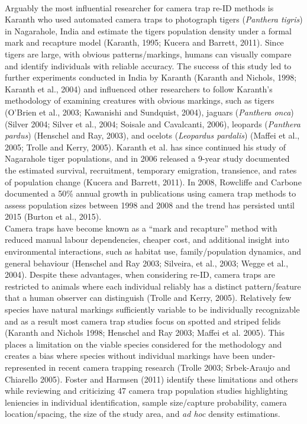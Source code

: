 \documentclass[11pt]{article}
\begin{document}
\newline
\\
Arguably the most influential researcher for camera trap re-ID methods is Karanth who used automated camera traps to photograph tigers (\textit{Panthera tigris}) in Nagarahole, India and estimate the tigers population density under a formal mark and recapture model (Karanth, 1995; Kucera and Barrett, 2011). Since tigers are large, with obvious patterns/markings, humans can visually compare and identify individuals with reliable accuracy. The success of this study led to further experiments conducted in India by Karanth (Karanth and Nichols, 1998; Karanth et al., 2004) and influenced other researchers to follow Karanth's methodology of examining creatures with obvious markings, such as tigers (O'Brien et al., 2003; Kawanishi and Sundquist, 2004), jaguars (\textit{Panthera onca}) (Silver 2004; Silver et al., 2004; Soisale and Cavalcanti, 2006), leopards (\textit{Panthera pardus}) (Henschel and Ray, 2003), and ocelots (\textit{Leopardus pardalis}) (Maffei et al., 2005; Trolle and Kerry, 2005). Karanth et al. has since continued his study of Nagarahole tiger populations, and in 2006 released a 9-year study documented the estimated survival, recruitment, temporary emigration, transience, and rates of population change (Kucera and Barrett, 2011). In 2008, Rowcliffe and Carbone documented a 50\% annual growth in publications using camera trap methods to assess population sizes between 1998 and 2008 and the trend has persisted until 2015 (Burton et al., 2015).
\newline
\\
Camera traps have become known as a ``mark and recapture'' method with reduced manual labour dependencies, cheaper cost, and additional insight into environmental interactions, such as habitat use, family/population dynamics, and general behaviour (Henschel and Ray 2003; Silveira, et al., 2003; Wegge et al., 2004). Despite these advantages, when considering re-ID, camera traps are restricted to animals where each individual reliably has a distinct pattern/feature that a human observer can distinguish (Trolle and Kerry, 2005). Relatively few species have natural markings sufficiently variable to be individually recognizable and as a result most camera trap studies focus on spotted and striped felids (Karanth and Nichols 1998; Henschel and Ray 2003; Maffei et al. 2005). This places a limitation on the viable species considered for the methodology and creates a bias where species without individual markings have been under-represented in recent camera trapping research (Trolle 2003; Srbek-Araujo and Chiarello 2005). Foster and Harmsen (2011) identify these limitations and others while reviewing and criticizing 47 camera trap population studies highlighting leniencies in individual identification, sample size/capture probability, camera location/spacing, the size of the study area, and \textit{ad hoc} density estimations.
\end{document}
